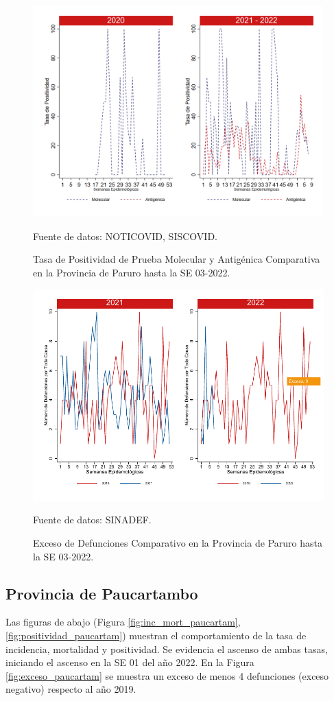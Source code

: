 \documentclass[12pt,a4paper,openany]{book}
\begin{document}
		\begin{figure}[h]
			\caption{Tasa de Positividad de Prueba Molecular y Antigénica Comparativa en la Provincia de Paruro hasta la SE 03-2022.}\label{fig:positividad_paruro}
			\begin{center}
				\includegraphics[width=0.7\linewidth]{../figuras/positividad_20_21_10.png}
			\end{center}
			{\footnotesize {Fuente de datos: NOTICOVID, SISCOVID.}}
		\end{figure}
		
		\begin{figure}[h]
			\caption{Exceso de Defunciones Comparativo en la Provincia de Paruro hasta la SE 03-2022.}\label{fig:exceso_paruro}
			\begin{center}
				\includegraphics[width=0.7\linewidth]{../figuras/exceso_10.pdf}
			\end{center}
			{\footnotesize {Fuente de datos: SINADEF.}}
		\end{figure}
		
		
		\clearpage
		
		\subsection*{Provincia de Paucartambo}
		\noindent Las figuras de abajo (Figura \ref{fig:inc_mort_paucartam}, \ref{fig:positividad_paucartam}) muestran el comportamiento de la tasa de incidencia, mortalidad y positividad. Se evidencia el ascenso de ambas tasas, iniciando el ascenso en la SE 01 del año 2022. 
	En la Figura \ref{fig:exceso_paucartam} se muestra un exceso de menos 4 defunciones (exceso negativo) respecto al año 2019.
		
\end{document}
